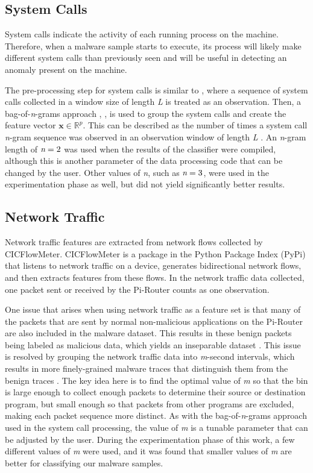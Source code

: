 \documentclass[runningheads]{llncs}
\begin{document}
\subsection{System Calls}
\indent System calls indicate the activity of each running process on the machine. Therefore, when a malware sample starts to execute, its process will likely make different system calls than previously seen and will be useful in detecting an anomaly present on the machine.

\indent The pre-processing step for system calls is similar to \cite{8659366}, where a sequence of system calls collected in a window size of length \emph{L} is treated as an observation. Then, a bag-of-\emph{n}-grams approach \cite{7272922}, \cite{8323956}, \cite{924295} is used to group the system calls and create the feature vector $\textbf{x} \in \mathbb{R}^p$. This can be described as the number of times a system call \emph{n}-gram sequence was observed in an observation window of length \emph{L} \cite{MALWARE19}. An \emph{n}-gram length of $\emph{n}=2$ was used when the results of the classifier were compiled, although this is another parameter of the data processing code that can be changed by the user. Other values of \emph{n}, such as $\emph{n}=3$, were used in the experimentation phase as well, but did not yield significantly better results.

\subsection{Network Traffic}
Network traffic features are extracted from network flows collected by CICFlowMeter. CICFlowMeter is a package in the Python Package Index (PyPi) that listens to network traffic on a device, generates bidirectional network flows, and then extracts features from these flows. In the network traffic data collected, one packet sent or received by the Pi-Router counts as one observation. 

\indent One issue that arises when using network traffic as a feature set is that many of the packets that are sent by normal non-malicious applications on the Pi-Router are also included in the malware dataset. This results in these benign packets being labeled as malicious data, which yields an inseparable dataset \cite{MALWARE19}. This issue is resolved by grouping the network traffic data into \emph{m}-second intervals, which results in more finely-grained malware traces that distinguish them from the benign traces \cite{MALWARE19}. The key idea here is to find the optimal value of \emph{m} so that the bin is large enough to collect enough packets to determine their source or destination program, but small enough so that packets from other programs are excluded, making each packet sequence more distinct. As with the bag-of-\emph{n}-grams approach used in the system call processing, the value of \emph{m} is a tunable parameter that can be adjusted by the user. During the experimentation phase of this work, a few different values of \emph{m} were used, and it was found that smaller values of \emph{m} are better for classifying our malware samples.
\end{document}
